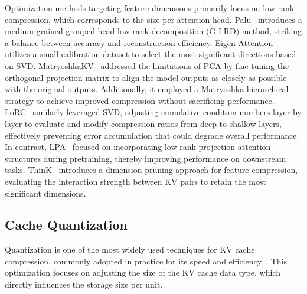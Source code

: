 Optimization methods targeting feature dimensions primarily focus on low-rank compression, which corresponds to the size per attention head. Palu~\citep{chang2024palu} introduces a medium-grained grouped head low-rank decomposition (G-LRD) method, striking a balance between accuracy and reconstruction efficiency. Eigen Attention~\citep{saxena2024eigen} utilizes a small calibration dataset to select the most significant directions based on SVD. MatryoshkaKV~\citep{lin2024matryoshkakv} addressed the limitations of PCA by fine-tuning the orthogonal projection matrix to align the model outputs as closely as possible with the original outputs. Additionally, it employed a Matryoshka hierarchical strategy to achieve improved compression without sacrificing performance. LoRC~\citep{zhang2024lorc} similarly leveraged SVD, adjusting cumulative condition numbers layer by layer to evaluate and modify compression ratios from deep to shallow layers, effectively preventing error accumulation that could degrade overall performance. In contrast, LPA~\citep{lv2024scalable} focused on incorporating low-rank projection attention structures during pretraining, thereby improving performance on downstream tasks. ThinK~\citep{xu2024think} introduces a dimension-pruning approach for feature compression, evaluating the interaction strength between KV pairs to retain the most significant dimensions.


\subsection{Cache Quantization}\label{sec3_6}
Quantization is one of the most widely used techniques for KV cache compression, commonly adopted in practice for its speed and efficiency~\citep{bai2023qwen, glm2024chatglm}. This optimization focuses on adjusting the size of the KV cache data type, which directly influences the storage size per unit.

